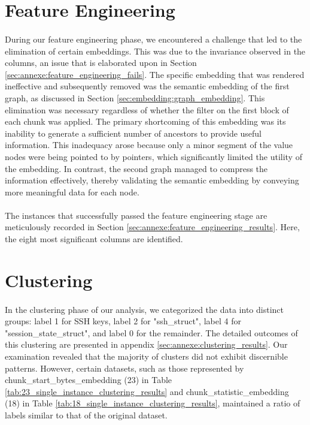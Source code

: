 \section{Feature Engineering}
\paragraph{}During our feature engineering phase, we encountered a challenge that led to the elimination of certain embeddings. This was due to the invariance observed in the columns, an issue that is elaborated upon in Section \ref{sec:annexe:feature_engineering_fails}. The specific embedding that was rendered ineffective and subsequently removed was the semantic embedding of the first graph, as discussed in Section \ref{sec:embedding:graph_embedding}. This elimination was necessary regardless of whether the filter on the first block of each chunk was applied. The primary shortcoming of this embedding was its inability to generate a sufficient number of ancestors to provide useful information. This inadequacy arose because only a minor segment of the value nodes were being pointed to by pointers, which significantly limited the utility of the embedding. In contrast, the second graph managed to compress the information effectively, thereby validating the semantic embedding by conveying more meaningful data for each node.

\paragraph{}The instances that successfully passed the feature engineering stage are meticulously recorded in Section \ref{sec:annexe:feature_engineering_results}. Here, the eight most significant columns are identified.

\section{Clustering}
\paragraph{}In the clustering phase of our analysis, we categorized the data into distinct groups: label 1 for SSH keys, label 2 for "ssh\_struct", label 4 for "session\_state\_struct", and label 0 for the remainder. The detailed outcomes of this clustering are presented in appendix \ref{sec:annexe:clustering_results}. Our examination revealed that the majority of clusters did not exhibit discernible patterns. However, certain datasets, such as those represented by chunk\_start\_bytes\_embedding (23) in Table \ref{tab:23_single_instance_clustering_results} and chunk\_statistic\_embedding (18) in Table \ref{tab:18_single_instance_clustering_results}, maintained a ratio of labels similar to that of the original dataset.


